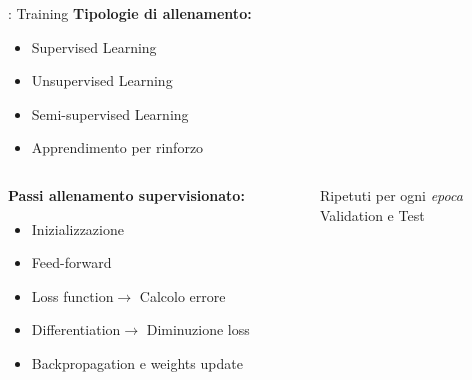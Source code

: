 \documentclass[xcolor=x11names,compress, 
					handout %
]{beamer}
\theoremstyle{definition} \newtheorem{esempio}{Esempio}
\theoremstyle{definition}
\begin{document}
		\begin{frame}{\subsecname: Training}
				\textbf{Tipologie di allenamento:}
				\begin{itemize}
					\item Supervised Learning\pause
					\item Unsupervised Learning\pause
					\item Semi-supervised Learning\pause
					\item Apprendimento per rinforzo
				\end{itemize}\pause
			\begin{columns}
				\begin{column}{0.7\textwidth}
					\textbf{Passi allenamento supervisionato:}
					\begin{itemize}
						\item Inizializzazione\pause
						\item Feed-forward\pause
						\item Loss function\pause $\rightarrow$ Calcolo errore\pause
						\item Differentiation\pause $\rightarrow$ Diminuzione loss\pause
						\item Backpropagation e weights update
					\end{itemize}\pause
				\end{column}
				\begin{column}{0.3\textwidth}
					\begin{center}
						Ripetuti per ogni \textit{epoca}\\
						Validation e Test
					\end{center}
				\end{column}
			\end{columns}
		\end{frame}
	
\end{document}
